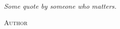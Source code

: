 
\vspace*{\fill}

\Large\textit{Some quote by someone who matters.}

\bigskip

\begin{flushright}
    \sffamily\scshape Author
\end{flushright}

\normalfont\normalsize

\vspace*{\fill}
